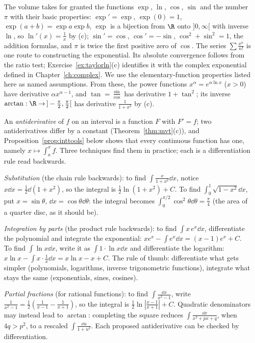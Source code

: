 \begin{reminder}
The volume takes for granted the functions $\exp$, $\ln$, $\cos$, $\sin$ and the number $\pi$ with their basic properties: $\exp'=\exp$, $\exp(0)=1$, $\exp(a+b)=\exp a\exp b$, $\exp$ is a bijection from $\R$ onto $]0,\infty[$ with inverse $\ln$, so $\ln'(x)=\frac1x$ by (c); $\sin'=\cos$, $\cos'=-\sin$, $\cos^2+\sin^2=1$, the addition formulas, and $\pi$ is twice the first positive zero of $\cos$. The series $\sum\frac{x^n}{n!}$ is one route to constructing the exponential. Its absolute convergence follows from the ratio test; Exercise~\ref{ex:taylorln}(c)
identifies it with the complex exponential defined in Chapter~\ref{ch:complex}. We use the elementary-function properties listed here as named assumptions. From these, the power functions $x^\alpha=e^{\alpha\ln x}$ ($x>0$) have derivative $\alpha x^{\alpha-1}$, and $\tan=\frac{\sin}{\cos}$ has derivative $1+\tan^2$; its inverse $\arctan:\R\to\,]-\frac\pi2,\frac\pi2[$ has derivative $\frac1{1+x^2}$ by (c).
\end{reminder}

\begin{examplex}
An \emph{antiderivative} of $f$ on an interval is a function $F$ with $F'=f$; two antiderivatives differ by a constant (Theorem~\ref{thm:mvt}(c)), and
Proposition~\ref{prop:inttools} below shows that every continuous function has one, namely $x\mapsto\int_a^xf$. Three techniques find them in practice; each is a
differentiation rule read backwards.

\emph{Substitution} (the chain rule backwards): to find $\int\frac{x}{1+x^2}\dd x$, notice $x\dd x=\frac12\dd(1+x^2)$, so the integral is $\frac12\ln(1+x^2)+C$. To find $\int_0^1\sqrt{1-x^2}\dd x$, put $x=\sin\theta$, $\dd x=\cos\theta\dd\theta$: the integral becomes $\int_0^{\pi/2}\cos^2\theta\dd\theta=\frac\pi4$ (the area of a quarter disc, as it should be).

\emph{Integration by parts} (the product rule backwards): to find $\int x\,e^x\dd x$, differentiate the polynomial and integrate the exponential: $xe^x-\int e^x\dd x=(x-1)e^x+C$. To find $\int\ln x\dd x$, write it as $\int1\cdot\ln x\dd x$ and differentiate the logarithm: $x\ln x-\int x\cdot\frac1x\dd x=x\ln x-x+C$. The rule of thumb: differentiate what gets simpler (polynomials, logarithms, inverse trigonometric functions), integrate what stays the same (exponentials, sines, cosines).

\emph{Partial fractions} (for rational functions): to find $\int\frac{\dd x}{x^2-1}$, write $\frac1{x^2-1}=\frac12\left(\frac1{x-1}-\frac1{x+1}\right)$, so the integral is $\frac12\ln\left|\frac{x-1}{x+1}\right|+C$. Quadratic denominators may instead lead to $\arctan$: completing the square reduces $\int\frac{\dd x}{x^2+px+q}$, when $4q>p^2$, to a rescaled $\int\frac{\dd u}{1+u^2}$. Each proposed antiderivative can be checked by differentiation.
\end{examplex}

